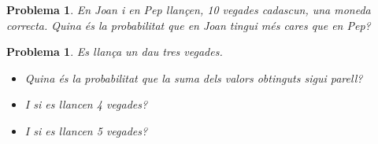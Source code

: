 \documentclass[11pt]{article}
\newcounter{prbcont}
\newtheorem{problema}[prbcont]{Problema}
\begin{document}

\begin{problema} 
En Joan i en Pep llan\c{c}en, 10 vegades cadascun, una moneda correcta. Quina \'es la probabilitat que en Joan tingui m\'es cares que en Pep?
\end{problema}

\begin{problema}
Es llan\c{c}a un dau tres vegades. 
\begin{itemize}
\item [(a)] Quina \'es la probabilitat que la suma dels valors obtinguts sigui parell? 
\item [(b)] I si es llancen 4 vegades? 
\item [(c)] I si es llancen 5 vegades?
\end{itemize}
\end{problema}

\end{document}
